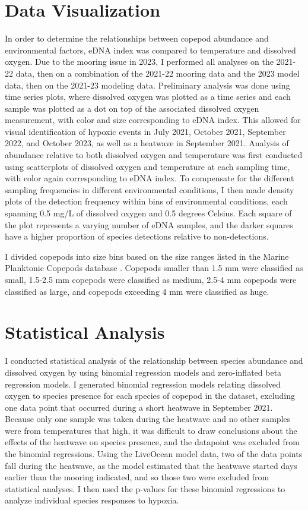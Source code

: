 \documentclass[12pt,twoside]{reedthesis}
\begin{document}
{	\section{Data Visualization}
	In order to determine the relationships between copepod abundance and environmental factors, eDNA index was compared to temperature and dissolved oxygen. Due to the mooring issue in 2023, I performed all analyses on the 2021-22 data, then on a combination of the 2021-22 mooring data and the 2023 model data, then on the 2021-23 modeling data. Preliminary analysis was done using time series plots, where dissolved oxygen was plotted as a time series and each sample was plotted as a dot on top of the associated dissolved oxygen measurement, with color and size corresponding to eDNA index. This allowed for visual identification of hypoxic events in July 2021, October 2021, September 2022, and October 2023, as well as a heatwave in September 2021. Analysis of abundance relative to both dissolved oxygen and temperature was first conducted using scatterplots of dissolved oxygen and temperature at each sampling time, with color again corresponding to eDNA index. To compensate for the different sampling frequencies in different environmental conditions, I then made density plots of the detection frequency within bins of environmental conditions, each spanning 0.5 mg/L of dissolved oxygen and 0.5 degrees Celsius. Each square of the plot represents a varying number of eDNA samples, and the darker squares have a higher proportion of species detections relative to non-detections. 
	
	I divided copepods into size bins based on the size ranges listed in the Marine Planktonic Copepods database \autocite{WoRMSWorldRegister}. Copepods smaller than 1.5 mm were classified as small, 1.5-2.5 mm copepods were classified as medium, 2.5-4 mm copepods were classified as large, and copepods exceeding 4 mm were classified as huge.
	
	\section{Statistical Analysis}
	I conducted statistical analysis of the relationship between species abundance and dissolved oxygen by using binomial regression models and zero-inflated beta regression models. I generated binomial regression models relating dissolved oxygen to species presence for each species of copepod in the dataset, excluding one data point that occurred during a short heatwave in September 2021. Because only one sample was taken during the heatwave and no other samples were from temperatures that high, it was difficult to draw conclusions about the effects of the heatwave on species presence, and the datapoint was excluded from the binomial regressions. Using the LiveOcean model data, two of the data points fall during the heatwave, as the model estimated that the heatwave started days earlier than the mooring indicated, and so those two were excluded from statistical analyses. I then used the p-values for these binomial regressions to analyze individual species responses to hypoxia. 
	
}
\end{document}

